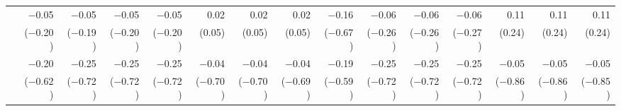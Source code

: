 \begin{tabularx}{1.45\textwidth}{lRRRRRRRRRRRRRR}
		 & \num{-0.05}\phantom{***)} & \num{-0.05}\phantom{***)} & \num{-0.05}\phantom{***)} & \num{-0.05}\phantom{***)} & \num{0.02}\phantom{***)} & \num{0.02}\phantom{***)} & \num{0.02}\phantom{***)} & \num{-0.16}\phantom{***)} & \num{-0.06}\phantom{***)} & \num{-0.06}\phantom{***)} & \num{-0.06}\phantom{***)} & \num{0.11}\phantom{***)} & \num{0.11}\phantom{***)} & \num{0.11}\phantom{***)} \\
		 & (\num{-0.20})\phantom{***} & (\num{-0.19})\phantom{***} & (\num{-0.20})\phantom{***} & (\num{-0.20})\phantom{***} & (\num{0.05})\phantom{***} & (\num{0.05})\phantom{***} & (\num{0.05})\phantom{***} & (\num{-0.67})\phantom{***} & (\num{-0.26})\phantom{***} & (\num{-0.26})\phantom{***} & (\num{-0.27})\phantom{***} & (\num{0.24})\phantom{***} & (\num{0.24})\phantom{***} & (\num{0.24})\phantom{***} \\ [\dspacing]
		 & \num{-0.20}\phantom{***)} & \num{-0.25}\phantom{***)} & \num{-0.25}\phantom{***)} & \num{-0.25}\phantom{***)} & \num{-0.04}\phantom{***)} & \num{-0.04}\phantom{***)} & \num{-0.04}\phantom{***)} & \num{-0.19}\phantom{***)} & \num{-0.25}\phantom{***)} & \num{-0.25}\phantom{***)} & \num{-0.25}\phantom{***)} & \num{-0.05}\phantom{***)} & \num{-0.05}\phantom{***)} & \num{-0.05}\phantom{***)} \\
		 & (\num{-0.62})\phantom{***} & (\num{-0.72})\phantom{***} & (\num{-0.72})\phantom{***} & (\num{-0.72})\phantom{***} & (\num{-0.70})\phantom{***} & (\num{-0.70})\phantom{***} & (\num{-0.69})\phantom{***} & (\num{-0.59})\phantom{***} & (\num{-0.72})\phantom{***} & (\num{-0.72})\phantom{***} & (\num{-0.72})\phantom{***} & (\num{-0.86})\phantom{***} & (\num{-0.86})\phantom{***} & (\num{-0.85})\phantom{***} \\ [\dspacing]
        \bottomrule
    \end{tabularx}%